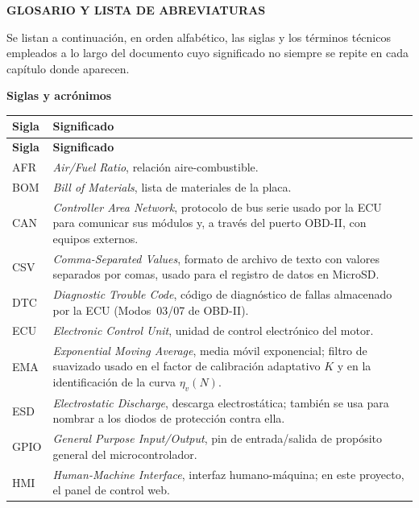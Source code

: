 \begin{center}
	\textbf{\Large GLOSARIO Y LISTA DE ABREVIATURAS}
\end{center}
\vspace{4mm}

Se listan a continuación, en orden alfabético, las siglas y los términos técnicos empleados a lo largo del documento cuyo significado no siempre se repite en cada capítulo donde aparecen.

\vspace{2mm}
\begin{center}\textbf{Siglas y acrónimos}\end{center}
\begin{longtable}{@{}p{2.6cm}p{11.5cm}@{}}
	\toprule
	\rowcolor[rgb]{.851,.851,.851}
	\textbf{Sigla} & \textbf{Significado} \\
	\midrule
	\endfirsthead
	\toprule
	\rowcolor[rgb]{.851,.851,.851}
	\textbf{Sigla} & \textbf{Significado} \\
	\midrule
	\endhead
	AFR & \textit{Air/Fuel Ratio}, relación aire-combustible. \\
	BOM & \textit{Bill of Materials}, lista de materiales de la placa. \\
	CAN & \textit{Controller Area Network}, protocolo de bus serie usado por la ECU para comunicar sus módulos y, a través del puerto OBD-II, con equipos externos. \\
	CSV & \textit{Comma-Separated Values}, formato de archivo de texto con valores separados por comas, usado para el registro de datos en MicroSD. \\
	DTC & \textit{Diagnostic Trouble Code}, código de diagnóstico de fallas almacenado por la ECU (Modos~03/07 de OBD-II). \\
	ECU & \textit{Electronic Control Unit}, unidad de control electrónico del motor. \\
	EMA & \textit{Exponential Moving Average}, media móvil exponencial; filtro de suavizado usado en el factor de calibración adaptativo $K$ y en la identificación de la curva $\eta_v(N)$. \\
	ESD & \textit{Electrostatic Discharge}, descarga electrostática; también se usa para nombrar a los diodos de protección contra ella. \\
	GPIO & \textit{General Purpose Input/Output}, pin de entrada/salida de propósito general del microcontrolador. \\
	HMI & \textit{Human-Machine Interface}, interfaz humano-máquina; en este proyecto, el panel de control web. \\

\end{longtable}
